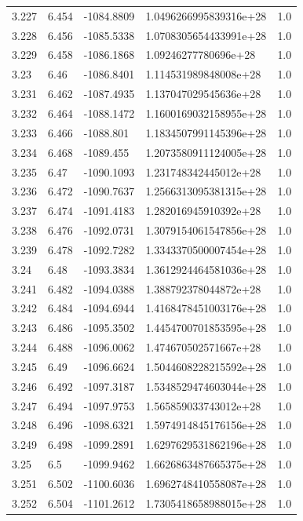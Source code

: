 \begin{tabular}{lllll}
3.227 & 6.454 & -1084.8809 & 1.0496266995839316e+28 & 1.0 \\
3.228 & 6.456 & -1085.5338 & 1.0708305654433991e+28 & 1.0 \\
3.229 & 6.458 & -1086.1868 & 1.09246277780696e+28 & 1.0 \\
3.23 & 6.46 & -1086.8401 & 1.114531989848008e+28 & 1.0 \\
3.231 & 6.462 & -1087.4935 & 1.137047029545636e+28 & 1.0 \\
3.232 & 6.464 & -1088.1472 & 1.1600169032158955e+28 & 1.0 \\
3.233 & 6.466 & -1088.801 & 1.1834507991145396e+28 & 1.0 \\
3.234 & 6.468 & -1089.455 & 1.2073580911124005e+28 & 1.0 \\
3.235 & 6.47 & -1090.1093 & 1.231748342445012e+28 & 1.0 \\
3.236 & 6.472 & -1090.7637 & 1.2566313095381315e+28 & 1.0 \\
3.237 & 6.474 & -1091.4183 & 1.282016945910392e+28 & 1.0 \\
3.238 & 6.476 & -1092.0731 & 1.3079154061547856e+28 & 1.0 \\
3.239 & 6.478 & -1092.7282 & 1.3343370500007454e+28 & 1.0 \\
3.24 & 6.48 & -1093.3834 & 1.3612924464581036e+28 & 1.0 \\
3.241 & 6.482 & -1094.0388 & 1.388792378044872e+28 & 1.0 \\
3.242 & 6.484 & -1094.6944 & 1.4168478451003176e+28 & 1.0 \\
3.243 & 6.486 & -1095.3502 & 1.4454700701853595e+28 & 1.0 \\
3.244 & 6.488 & -1096.0062 & 1.474670502571667e+28 & 1.0 \\
3.245 & 6.49 & -1096.6624 & 1.5044608228215592e+28 & 1.0 \\
3.246 & 6.492 & -1097.3187 & 1.5348529474603044e+28 & 1.0 \\
3.247 & 6.494 & -1097.9753 & 1.565859033743012e+28 & 1.0 \\
3.248 & 6.496 & -1098.6321 & 1.5974914845176156e+28 & 1.0 \\
3.249 & 6.498 & -1099.2891 & 1.6297629531862196e+28 & 1.0 \\
3.25 & 6.5 & -1099.9462 & 1.6626863487665375e+28 & 1.0 \\
3.251 & 6.502 & -1100.6036 & 1.6962748410558087e+28 & 1.0 \\
3.252 & 6.504 & -1101.2612 & 1.7305418658988015e+28 & 1.0 \\

\end{tabular}
